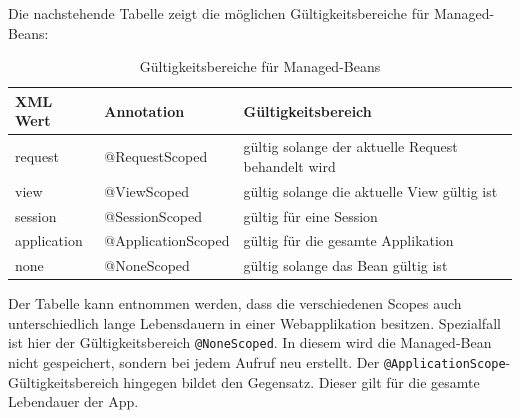 Die nachstehende Tabelle zeigt die möglichen Gültigkeitsbereiche für Managed-Beans:

\begin{table}[H]
\begin{center}
	\begin{tabular}{|l|l|l||}\hline
		\textbf{XML Wert} & \textbf{Annotation} & \textbf{Gültigkeitsbereich} \\ \hline	
		request & @RequestScoped & gültig solange der aktuelle Request behandelt wird\\ \hline \hline
		view & @ViewScoped & gültig solange die aktuelle View gültig ist\\ \hline \hline
		session & @SessionScoped & gültig für eine Session\\ \hline \hline
		application & @ApplicationScoped & gültig für die gesamte Applikation\\ \hline \hline
		none & @NoneScoped & gültig solange das Bean gültig ist\\ \hline \hline
	\end{tabular}
	\caption{Gültigkeitsbereiche für Managed-Beans}
	\label{tab:Scopes}
\end{center}
\end{table}

Der Tabelle kann entnommen werden, dass die verschiedenen Scopes auch unterschiedlich lange Lebensdauern in einer Webapplikation besitzen.
Spezialfall ist hier der Gültigkeitsbereich \texttt{@NoneScoped}. In diesem wird die Managed-Bean nicht gespeichert, sondern bei jedem Aufruf neu erstellt.
Der \texttt{@ApplicationScope}-Gültigkeitsbereich hingegen bildet den Gegensatz. Dieser gilt für die gesamte Lebendauer der App.

